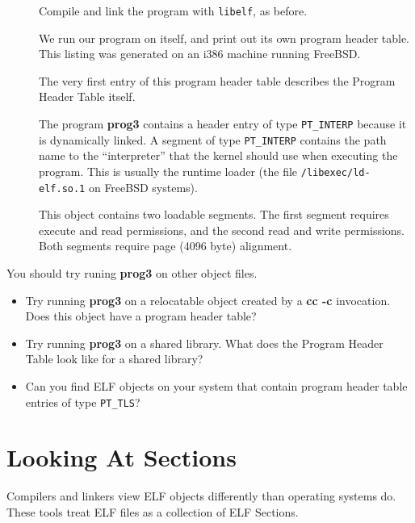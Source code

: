 \documentclass[a4paper,pdftex]{book}
\makeatletter
\newcommand{\constant}[1]{\texttt{#1}}
\newcommand{\filename}[1]{\texttt{#1}}
\newcommand{\library}[1]{\texttt{#1}}
\newcommand{\tool}[1]{\textbf{#1}}
\newcommand{\trade}{\texttrademark\xspace}
\newcommand{\elfdatastructure}[1]{\textsf{#1}}
\newenvironment{callout}[2][black]{%
  \begingroup\newcommand{\@cocolor}{#1}%
  \setlength{\shadowsize}{1.2pt}%
  \newcommand{\@cogroup}[1]{#2}}{\endgroup}
\newcommand{\@co}[1]{\shadowbox{\color{\@cocolor}#1}}
\newcommand{\coref}[1]{%
  \hypertarget{\@cogroup.#1.cr}{%
    \hyperlink{\@cogroup.#1.co}{\@co{#1}}}}
\makeatother
\begin{document}
\begin{callout}{scr3}
  \begin{description}
  \item[\coref{1}] Compile and link the program with \library{libelf},
    as before.
  \item[\coref{2}] We run our program on itself, and print out its own
    program header table.  This listing was generated on an i386\trade
    machine running FreeBSD\trade.
  \item[\coref{3}] The very first entry of this program header table
    describes the \elfdatastructure{Program Header Table} itself.%
  \item[\coref{4}] The program \tool{prog3} contains a header entry of
    type \constant{PT\_INTERP} because it is dynamically linked.  A
    segment of type \constant{PT\_INTERP} contains the path name to
    the ``interpreter'' that the kernel should use when executing the
    program.  This is usually the runtime loader (the file
    \filename{/libexec/ld-elf.so.1} on FreeBSD systems).
  \item[\coref{5} \coref{6}] This object contains two loadable
    segments. The first segment requires execute and read permissions,
    and the second read and write permissions.  Both segments require
    page (4096 byte) alignment.
  \end{description}
\end{callout}

You should try runing \tool{prog3} on other object files.

\begin{itemize}
\item Try running \tool{prog3} on a relocatable object created by a
  \tool{cc -c} invocation.  Does this object have a program header
  table?
\item Try running \tool{prog3} on a shared library.  What does the
  \elfdatastructure{Program Header Table} look like for a shared
  library?
\item Can you find ELF objects on your system that contain program
  header table entries of type \constant{PT\_TLS}?
\end{itemize}

\chapter{Looking At Sections}\label{chap.elf-sections}

Compilers and linkers view ELF objects differently than operating
systems do. These tools treat ELF files as a collection of ELF
\elfdatastructure{Sections}.
\end{document}
